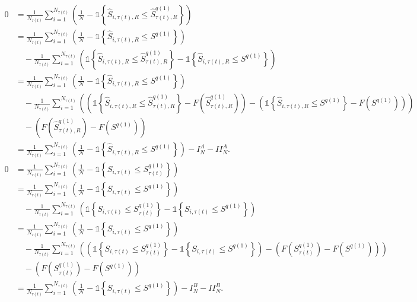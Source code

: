 \begin{align*}
0 &=\frac{1}{N_{\tau(t)}}\sum_{i=1}^{N_{\tau(t)}}\left( \frac{1}{\mathcal{N}}-\mathds{1}\left\{ \widehat{S}_{i,\tau(t),R}\leq \widehat{S}_{\tau(t),R}^{q(1)}\right\} \right) \\
&=\frac{1}{N_{\tau(t)}}\sum_{i=1}^{N_{\tau(t)}}\left( \frac{1}{\mathcal{N}}-\mathds{1}\left\{ \widehat{S}_{i,\tau(t),R}\leq S^{q(1)}\right\} \right) \\
&\quad -\frac{1}{N_{\tau(t)}}\sum_{i=1}^{N_{\tau(t)}}\left( \mathds{1}\left\{ \widehat{S}_{i,\tau(t),R}\leq \widehat{S}_{\tau(t),R}^{q(1)}\right\}-\mathds{1}\left\{ \widehat{S}_{i,\tau(t),R}\leq S^{q(1)}\right\} \right) \\
&=\frac{1}{N_{\tau(t)}}\sum_{i=1}^{N_{\tau(t)}}\left( \frac{1}{\mathcal{N}}-\mathds{1}\left\{ \widehat{S}_{i,\tau(t),R}\leq S^{q(1)}\right\} \right) \\
&\quad -\frac{1}{N_{\tau(t)}}\sum_{i=1}^{N_{\tau(t)}}\left( \left( \mathds{1}\left\{ \widehat{S}_{i,\tau(t),R}\leq \widehat{S}_{\tau(t),R}^{q(1)}\right\}- F\left( \widehat{S}_{\tau(t),R}^{q(1)}\right)\right) -\left( \mathds{1}\left\{ \widehat{S}_{i,\tau(t),R}\leq S^{q(1)}\right\}-F\left( S^{q(1)}\right) \right) \right) \\
&\quad -\left( F\left( \widehat{S}_{\tau(t),R}^{q(1)}\right)-F\left( S^{q(1)}\right) \right) \\
&=\frac{1}{N_{\tau(t)}}\sum_{i=1}^{N_{\tau(t)}}\left( \frac{1}{\mathcal{N}}-\mathds{1}\left\{ \widehat{S}_{i,\tau(t),R}\leq S^{q(1)}\right\} \right) - I_N^A - II_N^A.
\end{align*}
\begin{align*}
0 &=\frac{1}{N_{\tau(t)}}\sum_{i=1}^{N_{\tau(t)}}\left( \frac{1}{\mathcal{N}}-\mathds{1}\left\{ S_{i,\tau(t)}\leq S_{\tau(t)}^{q(1)}\right\} \right) \\
&=\frac{1}{N_{\tau(t)}}\sum_{i=1}^{N_{\tau(t)}}\left( \frac{1}{\mathcal{N}}-\mathds{1}\left\{ S_{i,\tau(t)}\leq S^{q(1)}\right\} \right) \\
&\quad -\frac{1}{N_{\tau(t)}}\sum_{i=1}^{N_{\tau(t)}}\left( \mathds{1}\left\{ S_{i,\tau(t)}\leq S_{\tau(t)}^{q(1)}\right\}-\mathds{1}\left\{ S_{i,\tau(t)}\leq S^{q(1)}\right\} \right) \\
&=\frac{1}{N_{\tau(t)}}\sum_{i=1}^{N_{\tau(t)}}\left( \frac{1}{\mathcal{N}}-\mathds{1}\left\{ S_{i,\tau(t)}\leq S^{q(1)}\right\} \right) \\
&\quad -\frac{1}{N_{\tau(t)}}\sum_{i=1}^{N_{\tau(t)}}\left( \left( \mathds{1}\left\{ S_{i,\tau(t)}\leq S_{\tau(t)}^{q(1)}\right\}-\mathds{1}\left\{ S_{i,\tau(t)}\leq S^{q(1)}\right\} \right) -\left( F\left( S_{\tau(t)}^{q(1)}\right)-F\left( S^{q(1)}\right) \right) \right) \\
&\quad -\left( F\left( S_{\tau(t)}^{q(1)}\right)-F\left( S^{q(1)}\right) \right) \\
&=\frac{1}{N_{\tau(t)}}\sum_{i=1}^{N_{\tau(t)}}\left( \frac{1}{\mathcal{N}}-\mathds{1}\left\{ S_{i,\tau(t)}\leq S^{q(1)}\right\} \right) - I_N^B- II_N^B.
\end{align*}
